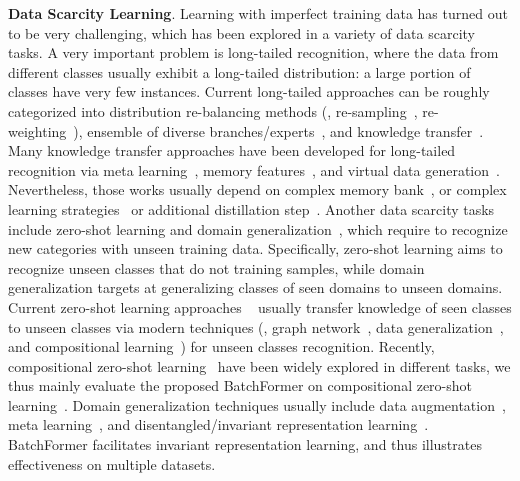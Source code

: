 \documentclass[10pt,twocolumn,letterpaper]{article}
\begin{document}
\textbf{Data Scarcity Learning}.
Learning with imperfect training data has turned out to be very challenging, which has been explored in a variety of data scarcity tasks. A very important problem is long-tailed recognition, where
the data from different classes usually exhibit a long-tailed distribution: a large portion of classes have very few instances. Current long-tailed approaches can be roughly categorized into distribution re-balancing methods (\eg, re-sampling~\cite{chawla2002smote, han2005borderline, he2009learning}, re-weighting~\cite{byrd2019effect, cui2019class, tan2020equalization,zhong2021improving, jamal2020rethinking}), ensemble of diverse branches/experts~\cite{zhou2020bbn, wang2020long, cai2021ace}, and knowledge transfer~\cite{wang2017learning, liu2019openlongtailrecognition, zhu2020inflated, he2021distilling, wang2021rsg}.
Many knowledge transfer approaches have been developed for long-tailed recognition via meta learning~\cite{wang2017learning}, memory features~\cite{liu2019openlongtailrecognition, zhu2020inflated}, and virtual data generation~\cite{he2021distilling, wang2021rsg, hou2021fcl}. Nevertheless, those works usually depend on complex memory bank~\cite{liu2019openlongtailrecognition, zhu2020inflated}, or complex learning strategies~\cite{wang2017learning} or additional distillation step~\cite{he2021distilling}.
Another data scarcity tasks include zero-shot learning and domain generalization~\cite{blanchard2011generalizing, zhou2021domain, wang2021generalizing}, which require to recognize new categories with unseen training data. Specifically, zero-shot learning aims to recognize unseen classes that do not training samples, while domain generalization targets at generalizing classes of seen domains to unseen domains. Current zero-shot learning approaches ~\cite{lampert2009learning, palatucci2009zero, xian2018zero, wang2019survey} usually transfer knowledge of seen classes to unseen classes via modern techniques (\eg, graph network~\cite{naeem2021learning}, data generalization~\cite{zhu2018generative}, and compositional learning~\cite{naeem2021learning, hou2020visual}) for unseen classes recognition. Recently, compositional zero-shot learning~\cite{kato2018compositional, hou2020visual, atzmon2020causal, naeem2021learning} have been widely explored in different tasks, we thus mainly evaluate the proposed BatchFormer on compositional zero-shot learning~\cite{naeem2021learning}. Domain generalization techniques usually include data augmentation~\cite{zhou2020learning, zhou2021domain}, meta learning~\cite{balaji2018metareg, zhao2021learning}, and disentangled/invariant representation learning~\cite{peng2019domain, arjovsky2019invariant, chattopadhyay2020learning, piratla2020efficient}.  BatchFormer facilitates invariant representation learning, and thus illustrates effectiveness on multiple datasets.
\end{document}
